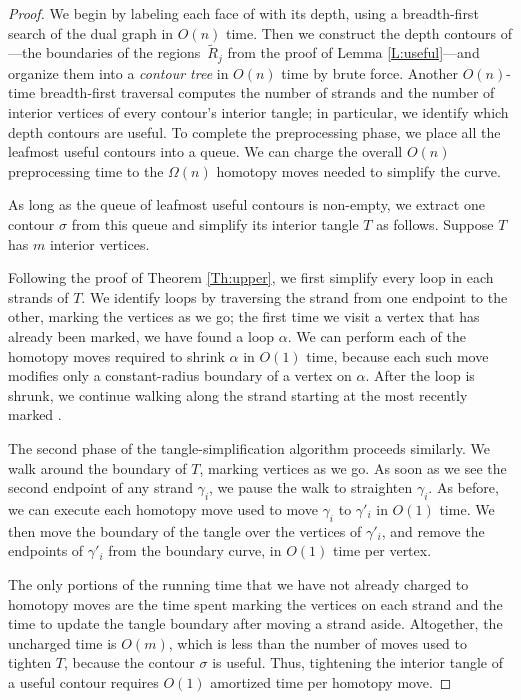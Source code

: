 \documentclass[11pt,twoside]{article}
\let\EDIT\relax
\numberwithin{figure}{section}
\begin{document}
\begin{proof}
We begin by labeling each face of \EDIT{$\gamma$} with its depth, using a breadth-first search of the dual graph in $O(n)$ time.  Then we construct the depth contours of \EDIT{$\gamma$}—the boundaries of the regions~$\tilde{R}_j$ from the proof of Lemma \ref{L:useful}—and organize them into a \emph{contour tree} in $O(n)$ time by brute force.  Another $O(n)$-time breadth-first traversal computes the number of strands and the number of interior vertices of every contour's interior tangle; in particular, we identify which depth contours are useful.  To complete the preprocessing phase, we place all the leafmost useful contours into a queue.  We can charge the overall $O(n)$ preprocessing time to the $\Omega(n)$ homotopy moves needed to simplify the curve.

As long as the queue of leafmost useful contours is non-empty, we extract one contour $\sigma$ from this queue and simplify its interior tangle $T$ as follows.  Suppose $T$ has $m$ interior vertices.

Following the proof of Theorem \ref{Th:upper}, we first simplify every loop in each strands of $T$.  We identify loops by traversing the strand from one endpoint to the other, marking the vertices as we go; the first time we visit a vertex that has already been marked, we have found a loop $\alpha$.  We can perform each of the homotopy moves required to shrink $\alpha$ in $O(1)$ time, because each such move modifies only a constant-radius boundary of a vertex on $\alpha$.  After the loop is shrunk, we continue walking along the strand starting at the most recently marked \EDIT{vertex}.

The second phase of the tangle-simplification algorithm proceeds similarly.  We walk around the boundary of $T$, marking vertices as we go.  As soon as we see the second endpoint of any strand $\gamma_i$, we pause the walk to straighten $\gamma_i$.  As before, we can execute each homotopy move used to move $\gamma_i$ to $\gamma'_i$ in $O(1)$ time. We then move the boundary of the tangle over the vertices of $\gamma'_i$, and remove the endpoints of $\gamma'_i$ from the boundary curve, in $O(1)$ time per vertex.

The only portions of the running time that we have not already charged to homotopy moves are the time spent marking the vertices on each strand and the time to update the tangle boundary after moving a strand aside.  Altogether, the uncharged time is $O(m)$, which is less than the number of moves used to tighten $T$, because the contour $\sigma$ is useful.  Thus, tightening the interior tangle of a useful contour requires $O(1)$ amortized time per homotopy move.


\end{proof}
\end{document}
